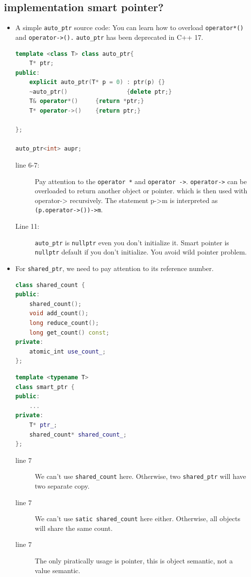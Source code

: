 \documentclass[a4paper,11pt,twoside]{book}
\begin{document}
\subsection{implementation smart pointer?}
\begin{itemize}
\item A simple \texttt{auto\_ptr} source code: You can learn how to overload \texttt{operator*()} and \texttt{operator->().}
\texttt{auto\_ptr} has been deprecated in C++ 17.
\begin{lstlisting}[frame=single, language=c++, mathescape=true]
template <class T> class auto_ptr{
    T* ptr;
public:
    explicit auto_ptr(T* p = 0) : ptr(p) {}
    ~auto_ptr()                 {delete ptr;}
    T& operator*()     {return *ptr;}
    T* operator->()    {return ptr;}

};

auto_ptr<int> aupr;
\end{lstlisting}

\begin{description}
	\item[line 6-7:] Pay attention to the \texttt{operator *} and \texttt{operator ->}. \texttt{operator->} can be overloaded to return another object or pointer. which is then used with operator-> recursively. The statement p->m is interpreted as \texttt{(p.operator->())->m}. 
	
	\item[Line 11:] \texttt{auto\_ptr} is \texttt{nullptr} even you don't initialize it. Smart pointer is \texttt{nullptr} default if you don't initialize. You avoid wild pointer problem.
\end{description}

	\item For \texttt{shared\_ptr}, we need to pay attention to its reference number. 
\begin{lstlisting}[frame=single, language=c++, mathescape=true]
class shared_count {
public:
	shared_count();
	void add_count();
	long reduce_count();
	long get_count() const;
private:
	atomic_int use_count_;
};
\end{lstlisting}

\begin{lstlisting}[frame=single, language=c++, mathescape=true]
template <typename T>
class smart_ptr {
public:  
	...
private:  
	T* ptr_;  
	shared_count* shared_count_;
};
\end{lstlisting}
\begin{description}
	\item[line 7] We can't use \texttt{shared\_count} here. Otherwise, two \texttt{shared\_ptr} will have two separate copy. 
	\item[line 7] We can't use \texttt{satic shared\_count} here either. Otherwise, all objects will share the same count.
	\item[line 7] The only piratically usage is pointer, this is object semantic, not a value semantic.  
\end{description}


\end{itemize}
\end{document}
